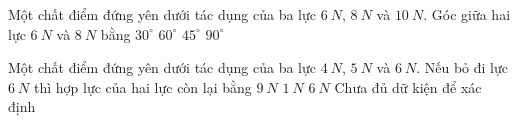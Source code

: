 \begin{vidu}%
Một chất điểm đứng yên dưới tác dụng của ba lực $6\ N$, $8\ N$ và $10\ N$. Góc giữa hai lực $6\ N$ và $8\ N$ bằng
\choice
{$30^\circ$}
{$60^\circ$}
{$45^\circ$}
{\True $90^\circ$}
\end{vidu}
\begin{vidu}%
Một chất điểm đứng yên dưới tác dụng của ba lực $4\ N$, $5\ N$ và $6\ N$. Nếu bỏ đi lực $6\ N$ thì hợp lực của hai lực còn lại bằng
\choice
{$9\ N$}
{$1\ N$}
{\True $6\ N$}
{Chưa đủ dữ kiện để xác định}
\end{vidu}
